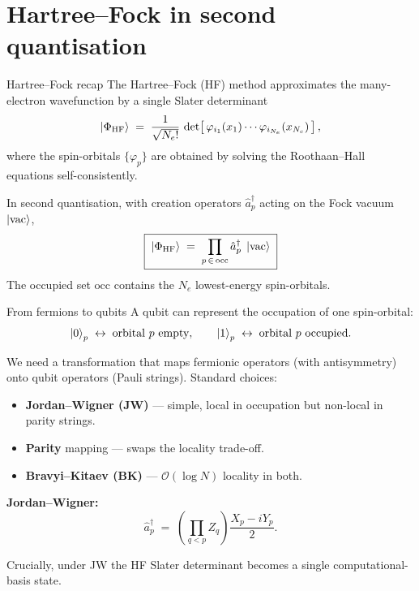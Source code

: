 \documentclass[10pt,aspectratio=169]{beamer}
\begin{document}
\section{Hartree--Fock in second quantisation}

\begin{frame}{Hartree--Fock recap}
The Hartree--Fock (HF) method approximates the many-electron wavefunction by a single Slater determinant
\[
\ket{\Phi_{\text{HF}}} \;=\; \frac{1}{\sqrt{N_e!}}\,
\det\!\left[\,\varphi_{i_1}(x_1)\cdots \varphi_{i_{N_e}}(x_{N_e})\,\right],
\]
where the spin-orbitals $\{\varphi_p\}$ are obtained by solving the Roothaan--Hall equations self-consistently.

\smallskip
In second quantisation, with creation operators $\hat a^{\dagger}_p$ acting on the Fock vacuum $\ket{\text{vac}}$,
\[
\boxed{\;\ket{\Phi_{\text{HF}}}\;=\; \prod_{p\,\in\, \text{occ}} \hat a^{\dagger}_p \;\ket{\text{vac}}\;}
\]
The occupied set $\text{occ}$ contains the $N_e$ lowest-energy spin-orbitals.
\end{frame}

\begin{frame}{From fermions to qubits}
A qubit can represent the occupation of one spin-orbital:
\[
\ket{0}_p \;\leftrightarrow\; \text{orbital } p \text{ empty}, \qquad
\ket{1}_p \;\leftrightarrow\; \text{orbital } p \text{ occupied}.
\]

We need a transformation that maps fermionic operators (with antisymmetry) onto qubit operators (Pauli strings). Standard choices:
\begin{itemize}
  \item \textbf{Jordan--Wigner (JW)} --- simple, local in occupation but non-local in parity strings.
  \item \textbf{Parity} mapping --- swaps the locality trade-off.
  \item \textbf{Bravyi--Kitaev (BK)} --- $\mathcal{O}(\log N)$ locality in both.
\end{itemize}

\smallskip
\textbf{Jordan--Wigner:}
\[
\hat a^{\dagger}_p \;=\; \left(\prod_{q<p} Z_q\right) \frac{X_p - i Y_p}{2}.
\]

Crucially, under JW the HF Slater determinant becomes a single computational-basis state.
\end{frame}
\end{document}
